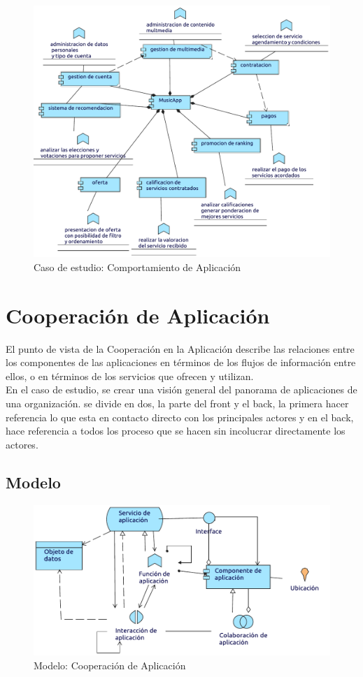 \begin{figure}[h!]
	\centering
	\includegraphics[width=\linewidth]{Arquitectura/Aplicacion/imgs/Comportamiento.pdf}
	\caption{Caso de estudio:  Comportamiento de Aplicación}
	\label{fig:comportamiento}
\end{figure}

\newpage

\section{Cooperación de Aplicación}
El punto de vista de la Cooperación en la Aplicación describe las relaciones entre los componentes de las aplicaciones en términos de los flujos de información entre ellos, o en términos de los servicios que ofrecen y utilizan. \\

En el caso de estudio, se  crear una visión general del panorama de aplicaciones de una organización. se divide en dos, la parte del front y el back, la primera hacer referencia lo que esta en contacto directo con los principales actores y en el back, hace referencia a todos los proceso que se hacen sin incolucrar directamente los actores.
\subsection{Modelo}
\begin{figure}[h!]
	\centering
	\includegraphics[width=\linewidth]{Arquitectura/Aplicacion/imgs/CooperacionMetamodelo.pdf}
	\caption{Modelo: Cooperación de Aplicación}
\end{figure}
\newpage
